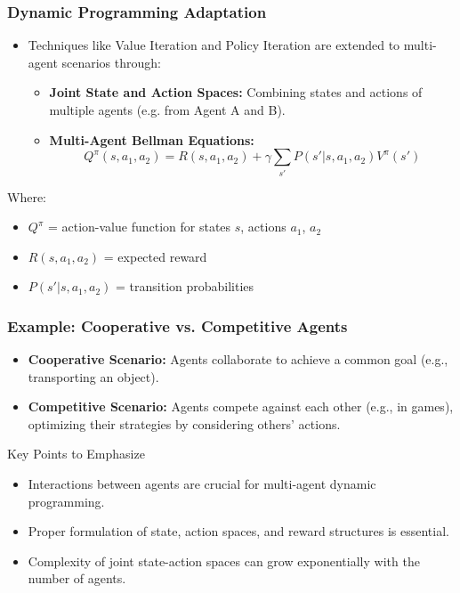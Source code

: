 \documentclass[aspectratio=169]{beamer}
\begin{document}
\begin{frame}[fragile]
    \frametitle{Dynamic Programming Adaptation}
    \begin{itemize}
        \item Techniques like Value Iteration and Policy Iteration are extended to multi-agent scenarios through:
        \begin{itemize}
            \item \textbf{Joint State and Action Spaces:} Combining states and actions of multiple agents (e.g. from Agent A and B).
            \item \textbf{Multi-Agent Bellman Equations:}
            \begin{equation}
                Q^{\pi}(s, a_1, a_2) = R(s, a_1, a_2) + \gamma \sum_{s'} P(s'|s, a_1, a_2) V^{\pi}(s')
            \end{equation}
            \end{itemize}
    \end{itemize}
    \begin{block}{Where:}
        \begin{itemize}
            \item \( Q^{\pi} \) = action-value function for states \( s \), actions \( a_1 \), \( a_2 \)
            \item \( R(s, a_1, a_2) \) = expected reward
            \item \( P(s'|s, a_1, a_2) \) = transition probabilities
        \end{itemize}
    \end{block}
\end{frame}

\begin{frame}[fragile]
    \frametitle{Example: Cooperative vs. Competitive Agents}
    \begin{itemize}
        \item \textbf{Cooperative Scenario:} Agents collaborate to achieve a common goal (e.g., transporting an object).
        \item \textbf{Competitive Scenario:} Agents compete against each other (e.g., in games), optimizing their strategies by considering others' actions.
    \end{itemize}
    \begin{block}{Key Points to Emphasize}
        \begin{itemize}
            \item Interactions between agents are crucial for multi-agent dynamic programming.
            \item Proper formulation of state, action spaces, and reward structures is essential.
            \item Complexity of joint state-action spaces can grow exponentially with the number of agents.
        \end{itemize}
    \end{block}
\end{frame}
\end{document}
